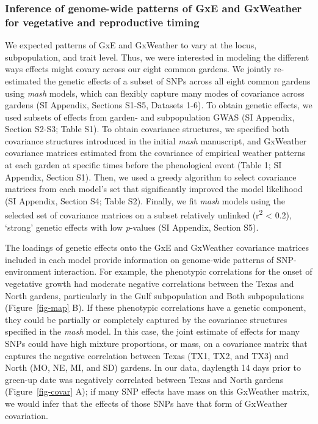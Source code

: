 \documentclass[
  9pt,
  twocolumn,
  twoside]{pnas-new}
\begin{document}
\subsubsection{Inference of genome-wide patterns of GxE and GxWeather
for vegetative and reproductive
timing}\label{inference-of-genome-wide-patterns-of-gxe-and-gxweather-for-vegetative-and-reproductive-timing}

We expected patterns of GxE and GxWeather to vary at the locus,
subpopulation, and trait level. Thus, we were interested in modeling the
different ways effects might covary across our eight common gardens. We
jointly re-estimated the genetic effects of a subset of SNPs across all
eight common gardens using \emph{mash} models, which can flexibly
capture many modes of covariance across gardens (SI Appendix, Sections
S1-S5, Datasets 1-6). To obtain genetic effects, we used subsets of
effects from garden- and subpopulation GWAS (SI Appendix, Section S2-S3;
Table S1). To obtain covariance structures, we specified both covariance
structures introduced in the initial \emph{mash} manuscript, and
GxWeather covariance matrices estimated from the covariance of empirical
weather patterns at each garden at specific times before the
phenological event (Table 1; SI Appendix, Section S1). Then, we used a
greedy algorithm to select covariance matrices from each model's set
that significantly improved the model likelihood (SI Appendix, Section
S4; Table S2). Finally, we fit \emph{mash} models using the selected set
of covariance matrices on a subset relatively unlinked
(r\textsuperscript{2} \textless{} 0.2), `strong' genetic effects with
low \emph{p}-values (SI Appendix, Section S5).

The loadings of genetic effects onto the GxE and GxWeather covariance
matrices included in each model provide information on genome-wide
patterns of SNP-environment interaction. For example, the phenotypic
correlations for the onset of vegetative growth had moderate negative
correlations between the Texas and North gardens, particularly in the
Gulf subpopulation and Both subpopulations (Figure~\ref{fig-map} B). If
these phenotypic correlations have a genetic component, they could be
partially or completely captured by the covariance structures specified
in the \emph{mash} model. In this case, the joint estimate of effects
for many SNPs could have high mixture proportions, or mass, on a
covariance matrix that captures the negative correlation between Texas
(TX1, TX2, and TX3) and North (MO, NE, MI, and SD) gardens. In our data,
daylength 14 days prior to green-up date was negatively correlated
between Texas and North gardens (Figure~\ref{fig-covar} A); if many SNP
effects have mass on this GxWeather matrix, we would infer that the
effects of those SNPs have that form of GxWeather covariation.
\end{document}
